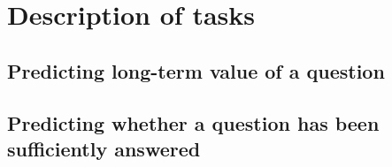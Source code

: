 \section{Description of tasks}

\subsection{Predicting long-term value of a question}

\subsection{Predicting whether a question has been sufficiently answered}